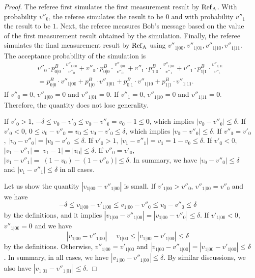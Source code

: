 \begin{proof}
    The referee first simulates the first measurement result by $\rm{Ref}_A$. With probability $v''_0$, the referee simulates the result to be $0$ and with probability $v''_1$ the result to be $1$. Next, the referee measures Bob's message based on the value of the first measurement result obtained by the simulation. Finally, the referee simulates the final measurement result by $\rm{Ref}_A$ using $v''_{1|00},v''_{1|01},v''_{1|10},v''_{1|11}$.
    The acceptance probability of the simulation is
    \begin{align*}
        &v''_{0} \cdot p_{0|0}^B \cdot \frac{v''_{1|00}}{v''_{0}} + v''_{0} \cdot p_{0|0}^B \cdot \frac{v''_{1|01}}{v''_{0}} + v''_{1} \cdot p_{1|0}^B \cdot \frac{v''_{1|10}}{v''_{1}} + v''_{1} \cdot p_{1|1}^B \cdot \frac{v''_{1|11}}{v''_{1}} \\
        &= p_{0|0}^B \cdot v''_{1|00} + p_{1|0}^B \cdot v''_{1|01} + p_{0|1}^B \cdot v''_{1|10} + p_{1|1}^B \cdot v''_{1|11}.
    \end{align*}
    If $v''_0=0$, $v''_{1|00} = 0$ and $v''_{1|01} = 0$. If $v''_1=0$, $v''_{1|10} = 0$ and $v''_{1|11} = 0$. Therefore, the quantity does not lose generality.

    If $v'_0 > 1$, $- \delta \leq v_0 - v'_0 \leq v_0 - v''_0 = v_0 - 1 \leq 0$, which implies $|v_0 - v''_0| \leq \delta$. If $v'_0 < 0$, $0 \leq v_0 - v''_0 = v_0 \leq v_0 - v'_0 \leq \delta$, which implies $|v_0 - v''_0| \leq \delta$. If $v''_0 = v'_0$, $|v_0 - v''_0| = |v_0 - v'_0| \leq \delta$.
    If $v'_0 > 1$, $|v_1 - v''_1| = v_1 = 1-v_0 \leq \delta$. If $v'_0 < 0$, $|v_1 - v''_1| = |v_1 - 1| = |v_0| \leq \delta$. If $v''_0 = v'_0$, $|v_1 - v''_1| = |(1-v_0) - (1-v''_0)| \leq \delta$. In summary, we have $|v_0 - v''_0| \leq \delta$ and $|v_1 - v''_1| \leq \delta$ in all cases.
    
    Let us show the quantity $|v_{1|00} - v''_{1|00}|$ is small.
    If $v'_{1|00} > v''_0$, $v''_{1|00} = v''_0$ and we have 
    \[
         - \delta \leq v_{1|00} - v'_{1|00} \leq v_{1|00} - v''_{0} \leq v_{0} - v''_{0} \leq \delta
    \]
    by the definitions, and it implies $|v_{1|00} - v''_{1|00}| = |v_{1|00} - v''_0| \leq \delta$. 
    If $v'_{1|00} < 0$, $v''_{1|00} = 0$ and we have
    \[
        |v_{1|00} - v''_{1|00}| =  v_{1|00} \leq |v_{1|00} - v'_{1|00}| \leq \delta
    \]
    by the definitions.
    Otherwise, $v''_{1|00} = v'_{1|00}$ and $|v_{1|00} - v''_{1|00}| = |v_{1|00} - v'_{1|00}| \leq \delta$. In summary, in all cases, we have $|v_{1|00} - v''_{1|00}| \leq \delta$. By similar discussions, we also have $|v_{1|01} - v''_{1|01}| \leq \delta$.


\end{proof}
